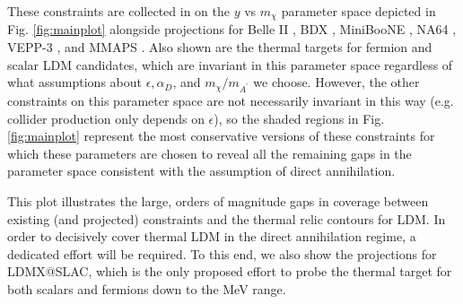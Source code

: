 These constraints are collected in on the $y$ vs $m_\chi$ parameter space depicted in Fig. \ref{fig:mainplot}  alongside projections
for Belle II \cite{Essig:2013vha}, BDX \cite{Izaguirre:2013uxa,Battaglieri:2016ggd}, MiniBooNE \cite{Dharmapalan:2012xp}, NA64 \cite{Gninenko:2016kpg}, VEPP-3 \cite{Wojtsekhowski:2012zq}, and MMAPS \cite{cornell}.
Also shown are the thermal targets for fermion and scalar LDM candidates, which are invariant in this parameter space regardless
of what assumptions about $\epsilon, \alpha_D$, and $m_\chi/m_{A^\prime}$ we choose. However, the other constraints on this 
parameter space are not necessarily invariant in this way (e.g. collider production only depends on $\epsilon$), so the 
shaded regions in Fig. \ref{fig:mainplot} represent the most conservative versions of these constraints for which
 these parameters are chosen to reveal all the remaining gaps in the parameter space consistent with the assumption of 
 direct annihilation. 
 
 This plot illustrates the large, orders of magnitude gaps in coverage between existing (and projected) constraints
 and the thermal relic contours for LDM. In order to decisively cover thermal LDM in the direct annihilation regime, a dedicated effort will
 be required. To this end, we also show the projections for LDMX@SLAC, which is the only proposed effort to probe the thermal
 target for both scalars and fermions down to the MeV range. 


